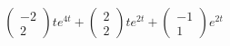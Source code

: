 \documentclass{article}
\begin{document}
\begin{align*}
\begin{pmatrix}
                                                -2 \\
                                                2
                                              \end{pmatrix} t e^{4 t} + \begin{pmatrix}
                                                                          2 \\
                                                                          2
                                                                        \end{pmatrix} t e^{2 t} + \begin{pmatrix}
                                                                                                    -1 \\
                                                                                                    1
                                                                                                  \end{pmatrix} e^{2 t}
\end{align*}

\setcounter{subsubsection}{34}
\subsubsection{}
\end{document}
